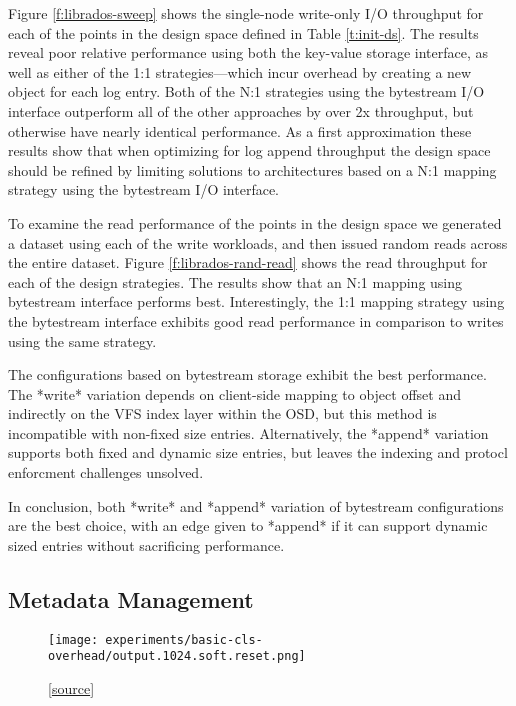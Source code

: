 \documentclass[10pt,twocolumn]{article}
\begin{document}
Figure \ref{f:librados-sweep} shows the single-node write-only I/O throughput
for each of the points in the design space defined in Table \ref{t:init-ds}.
The results reveal poor relative performance using both the key-value storage
interface, as well as either of the 1:1 strategies---which incur overhead by
creating a new object for each log entry. Both of the N:1 strategies using the
bytestream I/O interface outperform all of the other approaches by over 2x
throughput, but otherwise have nearly identical performance. As a first
approximation these results show that when optimizing for log append throughput
the design space should be refined by limiting solutions to architectures based
on a N:1 mapping strategy using the bytestream I/O interface.

To examine the read performance of the points in the design space we generated
a dataset using each of the write workloads, and then issued random reads
across the entire dataset. Figure \ref{f:librados-rand-read} shows the read
throughput for each of the design strategies. The results show that an N:1
mapping using bytestream interface performs best. Interestingly, the 1:1
mapping strategy using the bytestream interface exhibits good read performance
in comparison to writes using the same strategy.

The configurations based on bytestream storage exhibit the best performance.
The *write* variation depends on client-side mapping to object offset and
indirectly on the VFS index layer within the OSD, but this method is
incompatible with non-fixed size entries. Alternatively, the *append* variation
supports both fixed and dynamic size entries, but leaves the indexing and
protocl enforcment challenges unsolved.

In conclusion, both *write* and *append* variation of bytestream configurations
are the best choice, with an edge given to *append* if it can support dynamic
sized entries without sacrificing performance.

\subsection{Metadata Management}

\begin{figure}[h]
  \centering
  \texttt{[image: experiments/basic-cls-overhead/output.1024.soft.reset.png]}
  \caption{
[\href{https://github.com/noahdesu/zlog-popper/tree/master/experiments/basic-cls-overhead/visualize.ipynb}{source}]
}
\end{figure}
\end{document}
